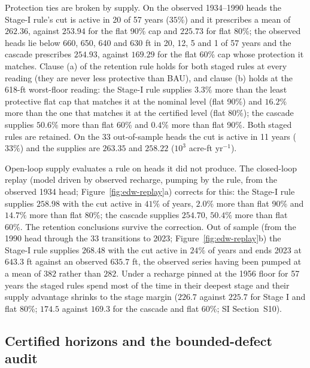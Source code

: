 \documentclass[11pt,a4paper]{article}
\theoremstyle{plain}
\theoremstyle{definition}
\theoremstyle{remark}
\begin{document}
Protection ties are broken by supply. On the observed 1934--1990 heads the Stage-I rule's cut is active in 20 of 57 years ($35\%$) and it prescribes a mean of $262.36$, against $253.94$ for the flat 90\% cap and $225.73$ for flat 80\%; the observed heads lie below 660, 650, 640 and 630 ft in 20, 12, 5 and 1 of 57 years and the cascade prescribes $254.93$, against $169.29$ for the flat 60\% cap whose protection it matches. Clause (a) of the retention rule holds for both staged rules at every reading (they are never less protective than BAU), and clause (b) holds at the 618-ft worst-floor reading: the Stage-I rule supplies $3.3\%$ more than the least protective flat cap that matches it at the nominal level (flat 90\%) and $16.2\%$ more than the one that matches it at the certified level (flat 80\%); the cascade supplies $50.6\%$ more than flat 60\% and $0.4\%$ more than flat 90\%. Both staged rules are retained. On the 33 out-of-sample heads the cut is active in 11 years ($33\%$) and the supplies are $263.35$ and $258.22$ ($10^3$ acre-ft yr$^{-1}$).

Open-loop supply evaluates a rule on heads it did not produce. The closed-loop replay (model driven by observed recharge, pumping by the rule, from the observed 1934 head; Figure~\ref{fig:edw-replay}a) corrects for this: the Stage-I rule supplies $258.98$ with the cut active in $41\%$ of years, $2.0\%$ more than flat 90\% and $14.7\%$ more than flat 80\%; the cascade supplies $254.70$, $50.4\%$ more than flat 60\%. The retention conclusions survive the correction. Out of sample (from the 1990 head through the 33 transitions to 2023; Figure~\ref{fig:edw-replay}b) the Stage-I rule supplies $268.48$ with the cut active in $24\%$ of years and ends 2023 at $643.3$ ft against an observed $635.7$ ft, the observed series having been pumped at a mean of $382$ rather than $282$. Under a recharge pinned at the 1956 floor for 57 years the staged rules spend most of the time in their deepest stage and their supply advantage shrinks to the stage margin ($226.7$ against $225.7$ for Stage I and flat 80\%; $174.5$ against $169.3$ for the cascade and flat 60\%; SI Section~S10).

\subsection{Certified horizons and the bounded-defect audit}\label{sec:edw-horizon}
\end{document}
